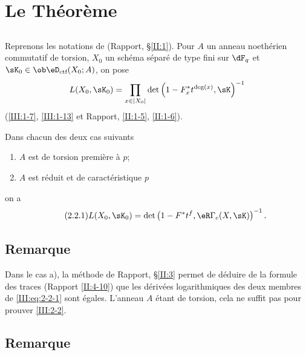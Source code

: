 \section{Le Théorème}\label{III:2}





\subsection{}\label{III:2-1}

Reprenons les notations de (Rapport, \S\ref{II:1}). Pour $A$ un anneau 
noethérien commutatif de torsion, $X_0$ un schéma séparé de type fini sur 
$\dF_q$ et $\sK_0\in\ob\eD_\text{ctf}(X_0;A)$, on pose 
\[
  L(X_0,\sK_0) = \prod_{x\in |X_0|} \det\left(1-F_x^* t^{\deg(x)}, \sK\right)^{-1}
\]
(\ref{III:1-7}, \ref{III:1-13} et Rapport, \ref{II:1-5}, \ref{II:1-6}). 





\begin{theorem_}\label{III:2-2}
Dans chacun des deux cas suivants
\begin{enumerate}[\indent a)]
  \item $A$ est de torsion première à $p$;
  \item $A$ est réduit et de caractéristique $p$
\end{enumerate}
on a 
\begin{equation*}\tag{2.2.1}\label{III:eq:2-2-1}
  L(X_0,\sK_0) = \det\left(1-F^* t^f, \eR\Gamma_c(X,\sK)\right)^{-1} \text{.}
\end{equation*}
\end{theorem_}





\subsection{Remarque}\label{III:2-3}

Dans le cas a), la méthode de Rapport, \S\ref{II:3} permet de déduire de 
la formule des traces (Rapport \ref{II:4-10}) que les dérivées logarithmiques 
des deux membres de \eqref{III:eq:2-2-1} sont égales. L'anneau $A$ étant de 
torsion, cela ne suffit pas pour prouver \ref{III:2-2}. 





\subsection{Remarque}\label{III:2-4}


